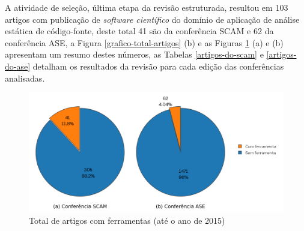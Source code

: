 A atividade de seleção, última etapa da revisão estruturada, resultou em 103
artigos com publicação de {\it software científico} do domínio de aplicação de
análise estática de código-fonte, deste total 41 são da conferência
SCAM e 62 da conferência ASE, a Figura \ref{grafico-total-artigos} (b) e as
Figuras \ref{ferramentas-por-conferencia} (a) e (b) apresentam um resumo destes
números, as Tabelas \ref{artigos-do-scam} e \ref{artigos-do-ase} detalham os
resultados da revisão para cada edição das conferências analisadas.

\begin{figure}[h]
  \center
  \includegraphics[scale=1]{imagens/ferramentas-por-conferencia.png}
  \caption{Total de artigos com ferramentas (até o ano de 2015)}
  \label{ferramentas-por-conferencia}
\end{figure}


